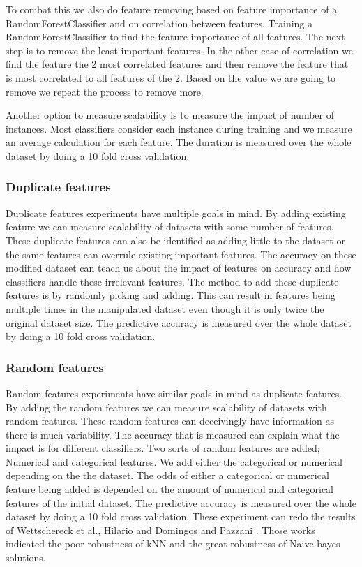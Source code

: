\documentclass[a4paper,10pt]{article}
\begin{document}
To combat this we also do feature removing based on feature importance of a RandomForestClassifier and on correlation between features. Training a RandomForestClassifier to find the feature importance of all features. The next step is to remove the least important features. In the other case of correlation we find the feature the 2 most correlated features and then remove the feature that is most correlated to all features of the 2. Based on the value we are going to remove we repeat the process to remove more.


Another option to measure scalability is to measure the impact of number of instances. Most classifiers consider each instance during training and we measure an average calculation for each feature. The duration is measured over the whole dataset by doing a 10 fold cross validation.

\subsubsection{Duplicate features}
Duplicate features experiments have multiple goals in mind. By adding existing feature we can measure scalability of datasets with some number of features. These duplicate features can also be identified as adding little to the dataset or the same features can overrule existing important features. The accuracy on these modified dataset
can teach us about the impact of features on accuracy and how classifiers handle these irrelevant features. The method to add these duplicate features is by randomly picking and adding. This can result in features being multiple times in the manipulated  dataset even though it is only twice the original dataset size. The predictive accuracy is measured over the whole dataset by doing a 10 fold cross validation.

\subsubsection{Random features}
Random features experiments have similar goals in mind as duplicate features. By adding the random features we can measure scalability of datasets with random features. These random features can deceivingly have information as there is much variability. The accuracy that is measured can explain what the impact is for different classifiers. Two sorts of random features are added; Numerical and categorical features. We add either the categorical or numerical depending on the the dataset. The odds of either a categorical or numerical feature being added is depended on the amount of numerical and categorical features of the initial dataset. The predictive accuracy is measured over the whole dataset by doing a 10 fold cross validation. These experiment can redo the results of Wettschereck et al., Hilario and Domingos and Pazzani \cite{redundant} \cite{Resil-1} \cite{Red-Bias}. Those works indicated the poor robustness of kNN and the great robustness of Naive bayes solutions.   %
\end{document}
